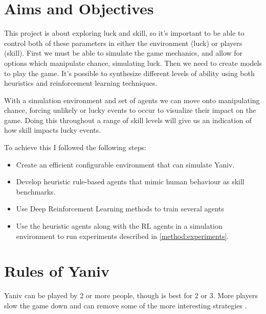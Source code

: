 \documentclass[../main.tex]{subfiles}
\begin{document}

\section{Aims and Objectives} \label{intro:aims}
This project is about exploring luck and skill, so it's important to be able to control both of these parameters in either the environment (luck) or players (skill). First we must be able to simulate the game mechanics, and allow for options which manipulate chance, simulating luck. Then we need to create models to play the game. It's possible to synthesize different levels of ability using both heuristics and reinforcement learning techniques. 

With a simulation environment and set of agents we can move onto manipulating chance, forcing unlikely or lucky events to occur to visualize their impact on the game. Doing this throughout a range of skill levels will give us an indication of how skill impacts lucky events. 

To achieve this I followed the following steps:
\begin{itemize}
    \item Create an efficient configurable environment that can simulate Yaniv.
    \item Develop heuristic rule-based agents that mimic human behaviour as skill benchmarks.
    \item Use Deep Reinforcement Learning methods to train several agents 
    \item Use the heuristic agents along with the RL agents in a simulation environment to run experiments described in \cref{method:experiments}.
\end{itemize}


\section{Rules of Yaniv} \label{intro:rules}
Yaniv can be played by 2 or more people, though is best for 2 or 3. More players slow the game down and can remove some of the more interesting strategies \cite{noauthor_rules_nodate}. 
\end{document}
